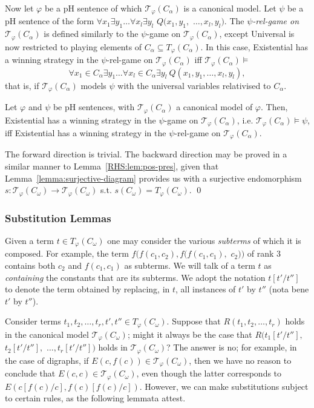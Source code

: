 \documentclass{LMCS}
\begin{document}
Now let $\varphi$ be a pH sentence of which $\mathcal{T}_\varphi(C_\alpha)$ is a canonical model. Let $\psi$ be a pH sentence of the form $\forall x_1 \exists y_1 \ldots \forall x_l \exists y_l$ $Q(x_1,y_1,$ $\ldots,x_l,y_l)$. The \emph{$\psi$-rel-game on $\mathcal{T}_\varphi(C_\alpha)$} is defined similarly to the $\psi$-game on $\mathcal{T}_\varphi(C_\alpha)$, except Universal is now restricted to playing elements of $C_\alpha \subseteq T_\varphi(C_\alpha)$. In this case, Existential has a winning strategy in the $\psi$-rel-game on $\mathcal{T}_\varphi(C_\alpha)$ iff $\mathcal{T}_\varphi(C_\alpha) \models$ 
\[ \forall x_1 \in C_\alpha \exists y_1 \ldots \forall x_l \in C_\alpha \exists y_l \ Q(x_1,y_1,\ldots,x_l,y_l),\]
that is, if $\mathcal{T}_\varphi(C_\alpha)$ models $\psi$ with the universal variables relativised to $C_\alpha$.
\begin{prop}
\label{prop:restrict-universal}
Let $\varphi$ and $\psi$ be pH sentences, with $\mathcal{T}_\varphi(C_\alpha)$ a canonical model of $\varphi$. Then,
Existential has a winning strategy in the $\psi$-game on $\mathcal{T}_\varphi(C_\alpha)$, i.e. $\mathcal{T}_\varphi(C_\alpha) \models \psi$, iff Existential has a winning strategy in the $\psi$-rel-game on $\mathcal{T}_\varphi(C_\alpha)$.
\end{prop}
\proof
The forward direction is trivial. The backward direction may be proved in a similar manner to Lemma~\ref{RHS:lem:pos-pres}, given that Lemma~\ref{lemma:surjective-diagram} provides us with a surjective endomorphism $s:\mathcal{T}_\varphi(C_\omega) \rightarrow \mathcal{T}_\varphi(C_\omega)$ s.t. $s(C_\omega)=T_\varphi(C_\omega)$.
\qed

\subsubsection{Substitution Lemmas}

Given a term $t \in T_\varphi(C_\omega)$ one may consider the various \emph{subterms} of which it is composed. For example, the term $f(f(c_1,c_2),f(f(c_1,c_1),$ $c_2))$ of rank $3$ contains both $c_2$ and $f(c_1,c_1)$ as subterms. We will talk of a term $t$ as \emph{containing} the constants that are its subterms.
We adopt the notation $t[t'/t'']$ to denote the term obtained by replacing, in $t$, all instances of $t'$ by $t''$ (nota bene $t'$ by $t''$).

Consider terms $t_1,t_2,\ldots,t_r,t',t'' \in T_\varphi(C_\omega)$.
Suppose that $R(t_1,t_2,\ldots,t_r)$ holds in the canonical model $\mathcal{T}_\varphi(C_\omega)$; might it always be the case that $R(t_1[t'/t''],$ $t_2[t'/t''],$ $\ldots,t_r[t'/t''])$ holds in $\mathcal{T}_\varphi(C_\omega)$? The answer is no; for example, in the case of digraphs, if $E(c,f(c)) \in \mathcal{T}_\varphi(C_\omega)$, then we have no reason to conclude that $E(c,c) \in \mathcal{T}_\varphi(C_\omega)$, even though the latter corresponds to $E(c[f(c)/c],f(c)[f(c)/c])$. However, we can make substitutions subject to certain rules, as the following lemmata attest. 
\end{document}
